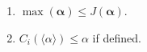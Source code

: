 \begin{enumerate}
\item $\max(\boldsymbol{\alpha}) \leq J(\boldsymbol{\alpha})$.
\item $C_i(\langle \alpha \rangle) \leq \alpha$ if defined.
\end{enumerate}
